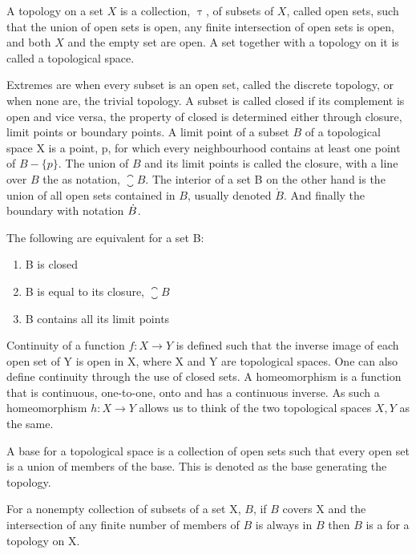 \documentclass[../../main.tex]{subfiles}
\begin{document}
    A topology on a set $X$ is a collection, $\uptau$, of subsets of $X$, called open sets, such that the union of open sets is open, any finite intersection of open sets is open, and both $X$ and the empty set are open. A set together with a topology on it is called a topological space. 
            
    Extremes are when every subset is an open set, called the discrete topology, or when none are, the trivial topology. A subset is called closed if its complement is open and vice versa, the property of closed is determined either through closure, limit points or boundary points. A limit point of a subset $B$ of a topological space X is a point, p, for which every neighbourhood contains at least one point of $B - \{p\}$. The union of $B$ and its limit points is called the closure, with a line over $B$ the as notation, $\closure{B}$. The interior of a set B on the other hand is the union of all open sets contained in $B$, usually denoted $\mathring{B}$. And finally the boundary with notation $\dot{B}$.
    
    \begin{theorem}
        The following are equivalent for a set B:
        \begin{enumerate}
            \item B is closed
            \item B is equal to its closure, $\closure{B}$
            \item B contains all its limit points
        \end{enumerate}
    \end{theorem}
    
    Continuity of a function $f:X\to Y$ is defined such that the inverse image of each open set of Y is open in X, where X and Y are topological spaces. One can also define continuity through the use of closed sets. A homeomorphism is a function that is continuous, one-to-one, onto and has a continuous inverse. As such a homeomorphism $h:X\to Y$ allows us to think of the two topological spaces $X, Y$ as the same. 
    
    A base for a topological space is a collection of open sets such that every open set is a union of members of the base. This is denoted as the base generating the topology.
    
    \begin{definition}
        For a nonempty collection of subsets of a set X, $B$, if $B$ covers X and the intersection of any finite number of members of $B$ is always in $B$ then $B$ is a  for a topology on X.
    \end{definition}
    
\end{document}
